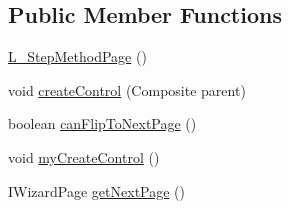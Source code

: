 \subsection*{Public Member Functions}
\begin{DoxyCompactItemize}
\item 
\hyperlink{classit_1_1isislab_1_1masonassisteddocumentation_1_1mason_1_1wizards_1_1_l___step_method_page_a177f2d92f21a604cf845592cb5158919}{L\-\_\-\-Step\-Method\-Page} ()
\item 
void \hyperlink{classit_1_1isislab_1_1masonassisteddocumentation_1_1mason_1_1wizards_1_1_l___step_method_page_a4bcfee20e1829a68842c43945e643363}{create\-Control} (Composite parent)
\item 
boolean \hyperlink{classit_1_1isislab_1_1masonassisteddocumentation_1_1mason_1_1wizards_1_1_l___step_method_page_a8c61c71b027f60b993ffe70e1ea723a8}{can\-Flip\-To\-Next\-Page} ()
\item 
void \hyperlink{classit_1_1isislab_1_1masonassisteddocumentation_1_1mason_1_1wizards_1_1_l___step_method_page_a5b1bfbacb4409e90ff72c3739e989672}{my\-Create\-Control} ()
\item 
I\-Wizard\-Page \hyperlink{classit_1_1isislab_1_1masonassisteddocumentation_1_1mason_1_1wizards_1_1_l___step_method_page_ac7b8048dd2841c779f601c26669af578}{get\-Next\-Page} ()
\end{DoxyCompactItemize}
